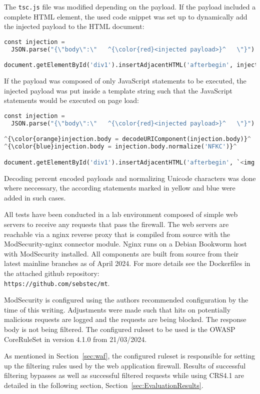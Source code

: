 The \verb|tsc.js| file was modified depending on the payload. If the payload included a complete HTML element, the used code snippet was set up to dynamically add the injected payload to the HTML document:

\begin{lstlisting}[style=basicStyle, language=Python, escapeinside=\^\^]
const injection = 
  JSON.parse("{\"body\":\"   ^{\color{red}<injected payload>}^   \"}")

document.getElementById('div1').insertAdjacentHTML('afterbegin', injection.body)
\end{lstlisting}

If the payload was composed of only JavaScript statements to be executed, the injected payload was put inside a template string such that the JavaScript statements would be executed on page load:

\begin{lstlisting}[style=basicStyle, language=Python, escapeinside=\^\^]
const injection = 
  JSON.parse("{\"body\":\"   ^{\color{red}<injected payload>}^   \"}")

^{\color{orange}injection.body = decodeURIComponent(injection.body)}^
^{\color{blue}injection.body = injection.body.normalize('NFKC')}^

document.getElementById('div1').insertAdjacentHTML('afterbegin', `<img src=0 onerror=${injection.body}>`)
\end{lstlisting}

Decoding percent encoded payloads and normalizing Unicode characters was done where neccessary, the according statements marked in yellow and blue were added in such cases.

All tests have been conducted in a lab environment composed of simple web servers to receive any requests that pass the firewall.
The web servers are reachable via a nginx reverse proxy that is compiled from source with the ModSecurity-nginx connector module. Nginx runs on a Debian Bookworm host with ModSecurity installed.
All components are built from source from their latest mainline branches as of April 2024.
For more details see the Dockerfiles in the attached github repository:\\ \verb|https://github.com/sebstec/mt|.

ModSecurity is configured using the authors recommended configuration by the time of this writing. \cite{modsec/recconf}
Adjustments were made such that hits on potentially malicious requests are logged and the requests are being blocked. The response body is not being filtered.
The configured ruleset to be used is the OWASP CoreRuleSet in version 4.1.0 from 21/03/2024. \cite{crs/410dl}

As mentioned in Section~\ref{sec:waf}, the configured ruleset is responsible for setting up the filtering rules used by the web application firewall. Results of successful filtering bypasses as well as successful filtered requests while using CRS4.1 are detailed in the following section, Section~\ref{sec:EvaluationResults}.
